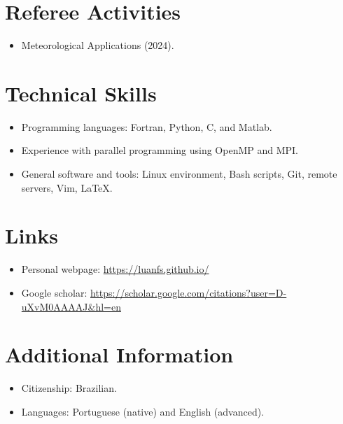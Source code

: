 \documentclass[letterpaper,11pt]{article}
\begin{document}
 
\section{Referee Activities}
\begin{itemize}
	\item Meteorological Applications (2024).
\end{itemize}

%
\section{Technical Skills}
\begin{itemize}
	\item Programming languages: Fortran, Python, C, and Matlab.
	\item Experience with parallel programming using OpenMP and MPI.
	\item General software and tools: Linux environment, Bash scripts, Git, remote servers, Vim, \LaTeX.
\end{itemize}


%
\section{Links}
\begin{itemize}
	\item Personal webpage:  \href{https://luanfs.github.io/}{https://luanfs.github.io/}
	\item Google scholar: \href{https://scholar.google.com/citations?user=D-uXvM0AAAAJ&hl=en}{https://scholar.google.com/citations?user=D-uXvM0AAAAJ\&hl=en}
\end{itemize}


\section{Additional Information}
\begin{itemize}
	\item Citizenship: Brazilian.
	\item Languages: Portuguese (native) and English (advanced).
\end{itemize}




\end{document}
